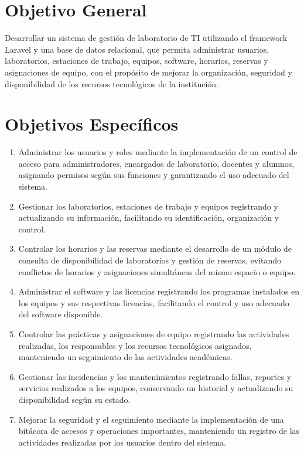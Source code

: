\section{Objetivo General}

Desarrollar un sistema de gestión de laboratorio de TI utilizando el framework Laravel y una base de datos relacional, que permita administrar usuarios, laboratorios, estaciones de trabajo, equipos, software, horarios, reservas y asignaciones de equipo, con el propósito de mejorar la organización, seguridad y disponibilidad de los recursos tecnológicos de la institución.

\section{Objetivos Específicos}

\begin{enumerate}

    \item Administrar los usuarios y roles mediante la implementación de un control de acceso para administradores, encargados de laboratorio, docentes y alumnos, asignando permisos según sus funciones y garantizando el uso adecuado del sistema.

    \item Gestionar los laboratorios, estaciones de trabajo y equipos registrando y actualizando su información, facilitando su identificación, organización y control.

    \item Controlar los horarios y las reservas mediante el desarrollo de un módulo de consulta de disponibilidad de laboratorios y gestión de reservas, evitando conflictos de horarios y asignaciones simultáneas del mismo espacio o equipo.

    \item Administrar el software y las licencias registrando los programas instalados en los equipos y sus respectivas licencias, facilitando el control y uso adecuado del software disponible.

    \item Controlar las prácticas y asignaciones de equipo registrando las actividades realizadas, los responsables y los recursos tecnológicos asignados, manteniendo un seguimiento de las actividades académicas.

    \item Gestionar las incidencias y los mantenimientos registrando fallas, reportes y servicios realizados a los equipos, conservando un historial y actualizando su disponibilidad según su estado.

    \item Mejorar la seguridad y el seguimiento mediante la implementación de una bitácora de accesos y operaciones importantes, manteniendo un registro de las actividades realizadas por los usuarios dentro del sistema.

\end{enumerate}


